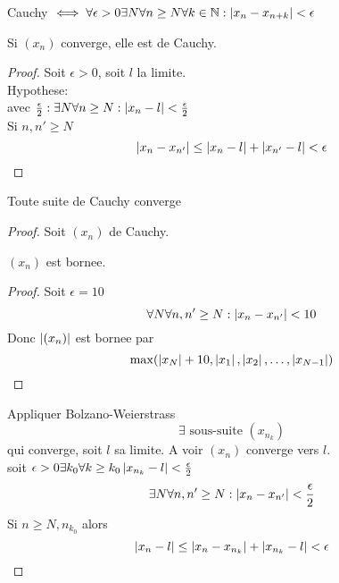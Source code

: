 \documentclass[../main.tex]{subfiles}
\begin{document}
Cauchy $\iff \forall \epsilon > 0 \exists N \forall n \geq N \forall k \in \mathbb{N}: \left\vert x_n - x_{n+k} \right\vert < \epsilon$

\begin{lemma}
	Si $(x_n)$ converge, elle est de Cauchy.
\end{lemma}
\begin{proof}
Soit $\epsilon > 0$, soit $l$ la limite.\\
Hypothese:\\
avec $\frac{\epsilon}{2} : \exists N \forall n \geq N: \left\vert x_{n} -l\right\vert < \frac{\epsilon}{2}$\\
Si $n,n' \geq N$ 
\[ 
	\left\vert x_n - x_{n'}\right\vert \leq \left\vert x_n - l\right\vert + \left\vert x_{n'} -l\right\vert < \epsilon
\]

\end{proof}
\begin{thm}\label{thm:convergence_des_suites_de_caucjy}
	Toute suite de Cauchy converge
\end{thm}

\begin{proof}
Soit $( x_n )$ de Cauchy.\\
\begin{lemma}
	$(x_n)$ est bornee.
	\begin{proof}
	Soit $\epsilon = 10$ 
	\[ 
		\forall N \forall n,n' \geq N: \left\vert x_n - x_{n'} \right\vert < 10
	\]
	Donc $\left\vert( x_n )\right\vert$ est bornee par
 \[ 
	 \max( \left\vert x_{N}\right\vert + 10, \left\vert x_1\right\vert , \left\vert x_2\right\vert, \ldots, \left\vert x_{N-1}\right\vert )
\]
	\end{proof}
\end{lemma}
	Appliquer Bolzano-Weierstrass
	\[ 
		\exists \text{ sous-suite } ( x_{n_k})
	\]
	qui converge, soit $l$ sa limite.
	A voir $(x_n)$ converge vers $l$.\\
	soit $\epsilon > 0 \exists k_0 \forall k \geq k_0 \left\vert x_{n_k} -l\right\vert < \frac{\epsilon}{2}$
	\[ 
		\exists N \forall n,n' \geq N: \left\vert x_n - x_{n'} \right\vert < \frac{\epsilon}{2}
	\]
	Si $n \geq N, n_{k_0} $ alors
	\[ 
		\left\vert x_n -l\right\vert \leq \left\vert x_n - x_{n_k}\right\vert + \left\vert x_{n_k} -l\right\vert < \epsilon
	\]
	

\end{proof}
	
\end{document}
